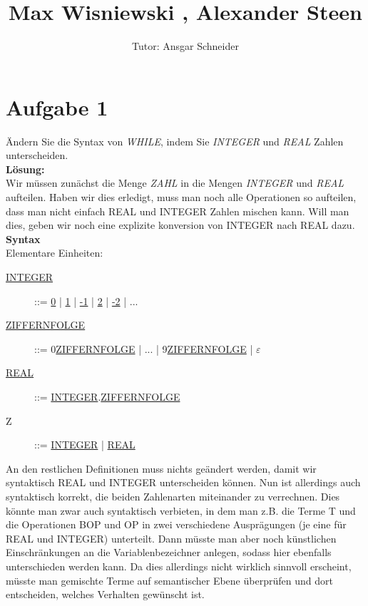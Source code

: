\documentclass[11pt,a4paper,ngerman]{article}
\author{Tutor: Ansgar Schneider}
\date{}
\title{Max Wisniewski , Alexander Steen}
\begin{document}

\maketitle
\thispagestyle{fancy}



\section*{Aufgabe 1}

Ändern Sie die Syntax von \emph{WHILE}, indem Sie \emph{INTEGER} und \emph{REAL} Zahlen unterscheiden.\\

\textbf{Lösung:}\\
Wir müssen zunächst die Menge \emph{ZAHL} in die Mengen \emph{INTEGER} und \emph{REAL} aufteilen. Haben wir dies erledigt, muss man noch alle Operationen so aufteilen, dass man nicht einfach REAL und INTEGER Zahlen mischen kann. Will man dies, geben wir noch eine explizite konversion von INTEGER nach REAL dazu.\\

\textbf{Syntax}\\
Elementare Einheiten:
\begin{description}
	\item[\mdseries \underline{INTEGER}] ::= \underline{0} | \underline{1}
		| 	\underline{-1} | \underline{2} | \underline{-2} | ...
	\item[\mdseries\underline{ZIFFERNFOLGE}] ::=  0\underline{ZIFFERNFOLGE}
		| ... | 9\underline{ZIFFERNFOLGE} | $\varepsilon$
	\item[\mdseries\underline{REAL}] ::= 
		\underline{INTEGER}.\underline{ZIFFERNFOLGE}
	\item[\mdseries Z] ::= \underline{INTEGER} | \underline{REAL}
\end{description}
An den restlichen Definitionen muss nichts geändert werden, damit wir syntaktisch \mbox{REAL} und INTEGER unterscheiden können. Nun ist allerdings auch syntaktisch korrekt, die beiden Zahlenarten miteinander zu verrechnen. Dies könnte man zwar auch syntaktisch verbieten, in dem man z.B. die Terme T und die Operationen BOP und OP in zwei verschiedene Ausprägungen (je eine für REAL und INTEGER) unterteilt. Dann müsste man aber noch künstlichen Einschränkungen an die Variablenbezeichner anlegen, sodass hier ebenfalls unterschieden werden kann. Da dies allerdings nicht wirklich sinnvoll erscheint, müsste man gemischte Terme auf semantischer Ebene überprüfen und dort entscheiden, welches Verhalten gewünscht ist.
\end{document}
